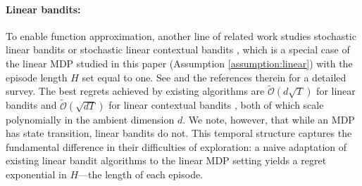 \paragraph{Linear bandits:} To enable function approximation, another line of related work studies stochastic linear bandits or stochastic linear contextual bandits \cite[see, e.g.,][]{auer2002using, dani2008stochastic, li2010contextual, rusmevichientong2010linearly, chu2011contextual, abbasi2011improved}, which is a special case of the linear MDP studied in this paper (Assumption \ref{assumption:linear}) with the episode length $H$ set equal to one. See \cite{bubeck2012regret, lattimore2018bandit} and the references therein for a detailed survey. The best regrets achieved by existing algorithms are $\tilde{\mathcal{O}}(d\sqrt{T})$ for linear bandits \cite{abbasi2011improved} and $\tilde{\mathcal{O}}(\sqrt{d T})$ for linear contextual bandits \cite{auer2002using,chu2011contextual}, both of which scale polynomially in the ambient dimension $d$. We note, however, that while an MDP has state transition, linear bandits do not. This temporal structure captures the fundamental difference in their difficulties of exploration: a naive adaptation of existing linear bandit algorithms to the linear MDP setting yields a regret exponential in $H$---the length of each episode.




